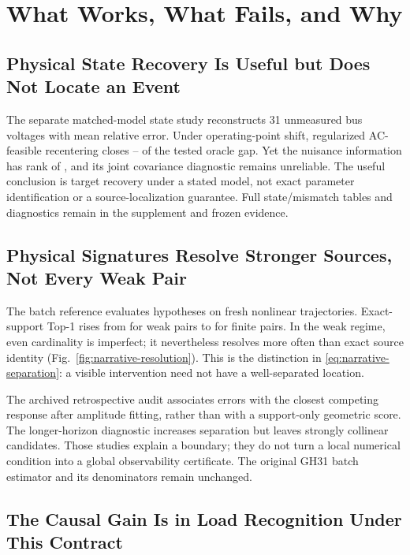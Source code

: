 \section{What Works, What Fails, and Why}
\label{sec:narrative-results}

\subsection{Physical State Recovery Is Useful but Does Not Locate an Event}

The separate matched-model state study reconstructs 31 unmeasured bus voltages with \BTwoTVE{} mean relative error. Under operating-point shift, regularized AC-feasible recentering closes \EZeroHClosureHalf{}--\EZeroHClosureMax{} of the tested oracle gap. Yet the nuisance information has rank \EZeroHRank{} of \EZeroHDimension{}, and its joint covariance diagnostic remains unreliable. The useful conclusion is target recovery under a stated model, not exact parameter identification or a source-localization guarantee. Full state/mismatch tables and diagnostics remain in the supplement and frozen evidence.

\subsection{Physical Signatures Resolve Stronger Sources, Not Every Weak Pair}

The batch reference evaluates \GlobalHypothesisCount{} hypotheses on \GlobalPhysicalTrajectories{} fresh nonlinear trajectories. Exact-support Top-1 rises from \GlobalWeakTopOne{} for weak pairs to \GlobalFiniteTopOne{} for finite pairs. In the weak regime, even cardinality is imperfect; it nevertheless resolves more often than exact source identity (Fig.~\ref{fig:narrative-resolution}). This is the distinction in \eqref{eq:narrative-separation}: a visible intervention need not have a well-separated location.

The archived retrospective audit associates errors with the closest competing response after amplitude fitting, rather than with a support-only geometric score. The longer-horizon diagnostic increases separation but leaves strongly collinear candidates. Those studies explain a boundary; they do not turn a local numerical condition into a global observability certificate. The original GH31 batch estimator and its denominators remain unchanged.

\subsection{The Causal Gain Is in Load Recognition Under This Contract}

